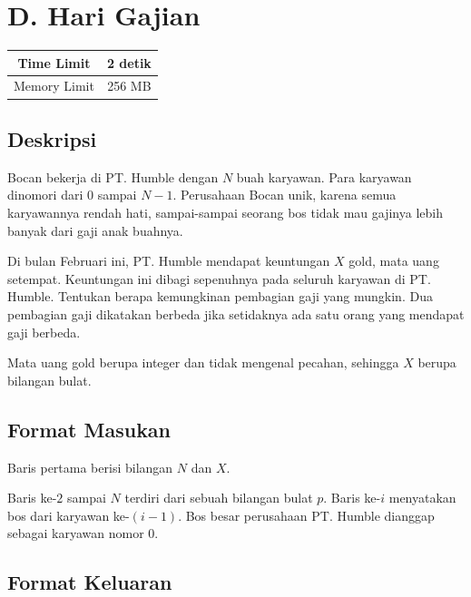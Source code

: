 \documentclass{article}
\begin{document}
\section*{\hfil D. Hari Gajian\hfil}

\begin{center}
\begin{tabular}{ |cc| } 
 \hline
 Time Limit & 2 detik \\
 \hline 
 Memory Limit & 256 MB \\
 \hline
\end{tabular}
\end{center}

\subsection*{Deskripsi}

\par\noindent Bocan bekerja di PT. Humble dengan $N$ buah karyawan. Para karyawan dinomori dari $0$ sampai $N-1$. Perusahaan Bocan unik, karena semua karyawannya rendah hati, sampai-sampai seorang bos tidak mau gajinya lebih banyak dari gaji anak buahnya.

\par\noindent Di bulan Februari ini, PT. Humble mendapat keuntungan $X$ gold, mata uang setempat. Keuntungan ini dibagi sepenuhnya pada seluruh karyawan di PT. Humble. Tentukan berapa kemungkinan pembagian gaji yang mungkin. Dua pembagian gaji dikatakan berbeda jika setidaknya ada satu orang yang mendapat gaji berbeda.

\par\noindent Mata uang gold berupa integer dan tidak mengenal pecahan, sehingga $X$ berupa bilangan bulat.

\subsection*{Format Masukan}

\par\noindent Baris pertama berisi bilangan $N$ dan $X$.
\par\noindent Baris ke-$2$ sampai $N$ terdiri dari sebuah bilangan bulat $p$. Baris ke-$i$ menyatakan bos dari karyawan ke-$(i-1)$. Bos besar perusahaan PT. Humble dianggap sebagai karyawan nomor $0$.

\subsection*{Format Keluaran}
\end{document}
